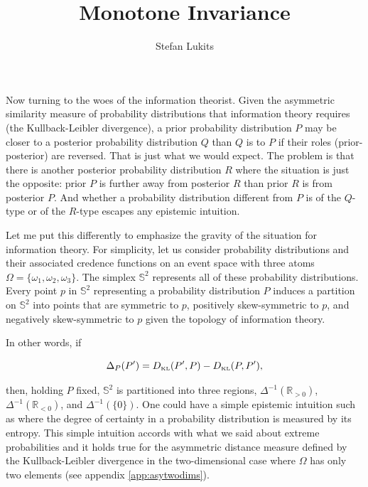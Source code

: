 \documentclass[11pt]{article}
\begin{document}
\setpagewiselinenumbers
\modulolinenumbers[5]
\linenumbers


\title{Monotone Invariance}
\author{Stefan Lukits}
\date{}
\maketitle


Now turning to the woes of the information theorist. Given the
asymmetric similarity measure of probability distributions that
information theory requires (the Kullback-Leibler divergence), a prior
probability distribution $P$ may be closer to a posterior probability
distribution $Q$ than $Q$ is to $P$ if their roles (prior-posterior)
are reversed. That is just what we would expect. The problem is that
there is another posterior probability distribution $R$ where the
situation is just the opposite: prior $P$ is further away from
posterior $R$ than prior $R$ is from posterior $P$. And whether a
probability distribution different from $P$ is of the $Q$-type or of
the $R$-type escapes any epistemic intuition.

Let me put this differently to emphasize the gravity of the situation
for information theory. For simplicity, let us consider probability
distributions and their associated credence functions on an event
space with three atoms $\Omega=\{\omega_{1},\omega_{2},\omega_{3}\}$.
The simplex $\mathbb{S}^{2}$ represents all of these probability
distributions. Every point $p$ in $\mathbb{S}^{2}$ representing a
probability distribution $P$ induces a partition on $\mathbb{S}^{2}$
into points that are symmetric to $p$, positively skew-symmetric to
$p$, and negatively skew-symmetric to $p$ given the topology of
information theory.

In other words, if

\begin{equation}
  \label{eq:sksy}
  \Delta_{P}(P')=D_{\mbox{\tiny KL}}(P',P)-D_{\mbox{\tiny KL}}(P,P'),
\end{equation}

then, holding $P$ fixed, $\mathbb{S}^{2}$ is partitioned into three
regions, $\Delta^{-1}(\mathbb{R}_{>0})$,
$\Delta^{-1}(\mathbb{R}_{<0})$, and $\Delta^{-1}(\{0\})$. One could
have a simple epistemic intuition such as  where
the degree of certainty in a probability distribution is measured by
its entropy. This simple intuition accords with what we said about
extreme probabilities and it holds true for the asymmetric distance
measure defined by the Kullback-Leibler divergence in the
two-dimensional case where $\Omega$ has only two elements (see
appendix \ref{app:asytwodims}).
\end{document}
